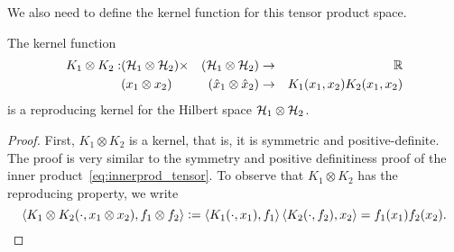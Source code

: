 %
We also need to define the kernel function for this tensor product space.
\begin{proposition}
    The kernel function
    \begin{equation}
        \nonumber
        \begin{aligned}
            K_1 \otimes K_2: &(\mathcal{H}_1 \otimes \mathcal{H}_2) \times &(\mathcal{H}_1 \otimes \mathcal{H}_2) &\to & \mathbb{R} \\
        &(x_1 \otimes x_2) &(\hat{x}_1 \otimes \hat{x}_2) &\to & K_1(x_1, x_2)  K_2(x_1, x_2) 
        \end{aligned}
    \end{equation}
    is a reproducing kernel for the Hilbert space $\mathcal{H}_1 \otimes \mathcal{H}_2$.
\end{proposition} 
\begin{proof}
    First, $K_1 \otimes K_2$ is a kernel, that is, it is symmetric and positive-definite. The proof is very similar to the symmetry and positive definitiness proof of the inner product~\eqref{eq:innerprod_tensor}.
    To observe that $K_1 \otimes K_2$ has the reproducing property, we write
    $$ \left\langle K_1 \otimes K_2 (\cdot, x_1 \otimes x_2), f_1 \otimes f_2 \right\rangle \vcentcolon= \left\langle K_1(\cdot, x_1), f_1 \right\rangle \left\langle K_2(\cdot, f_2), x_2 \right\rangle = f_1(x_1) f_2(x_2) .$$
\end{proof}
